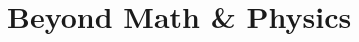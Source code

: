 \documentclass[12pt, a4paper]{report}
\begin{document}
% 
% 
% 
% 

% 
% 
% 
% 
% 
% 
% 
% 
% 
% 

\part{Beyond Math \& Physics}
% 

% 

% 

% 
% 


\printnomenclature



\adjustmtc

\printindex
\printindex[author]
\end{document}
